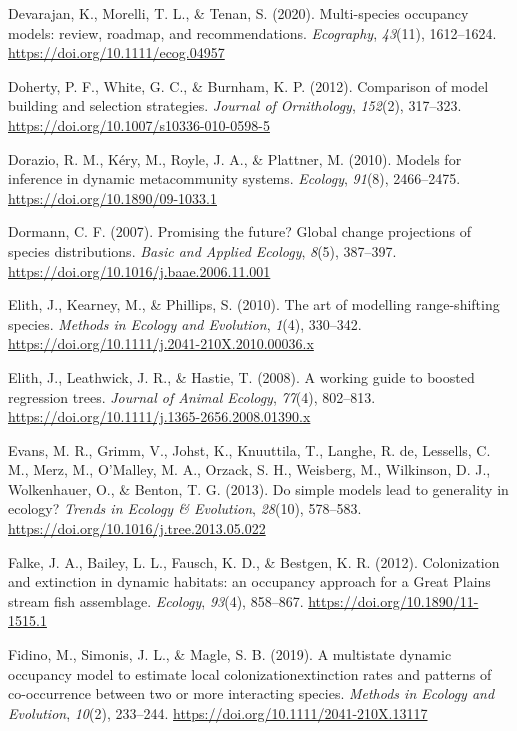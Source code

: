 \documentclass[
]{article}
\newlength{\cslhangindent}
\newenvironment{CSLReferences}[2] %
 {\begin{list}{}{%
  \setlength{\itemindent}{0pt}
  \setlength{\leftmargin}{0pt}
  \setlength{\parsep}{0pt}
  \ifodd #1
   \setlength{\leftmargin}{\cslhangindent}
   \setlength{\itemindent}{-1\cslhangindent}
  \fi
  \setlength{\itemsep}{#2\baselineskip}}}
 {\end{list}}
\begin{document}
\begin{CSLReferences}{1}{0}
Devarajan, K., Morelli, T. L., \& Tenan, S. (2020). Multi{-}species
occupancy models: review, roadmap, and recommendations.
\emph{Ecography}, \emph{43}(11), 1612--1624.
\url{https://doi.org/10.1111/ecog.04957}

Doherty, P. F., White, G. C., \& Burnham, K. P. (2012). Comparison of
model building and selection strategies. \emph{Journal of Ornithology},
\emph{152}(2), 317--323. \url{https://doi.org/10.1007/s10336-010-0598-5}

Dorazio, R. M., Kéry, M., Royle, J. A., \& Plattner, M. (2010). Models
for inference in dynamic metacommunity systems. \emph{Ecology},
\emph{91}(8), 2466--2475. \url{https://doi.org/10.1890/09-1033.1}

Dormann, C. F. (2007). Promising the future? Global change projections
of species distributions. \emph{Basic and Applied Ecology}, \emph{8}(5),
387--397. \url{https://doi.org/10.1016/j.baae.2006.11.001}

Elith, J., Kearney, M., \& Phillips, S. (2010). The art of modelling
range-shifting species. \emph{Methods in Ecology and Evolution},
\emph{1}(4), 330--342.
\url{https://doi.org/10.1111/j.2041-210X.2010.00036.x}

Elith, J., Leathwick, J. R., \& Hastie, T. (2008). A working guide to
boosted regression trees. \emph{Journal of Animal Ecology},
\emph{77}(4), 802--813.
\url{https://doi.org/10.1111/j.1365-2656.2008.01390.x}

Evans, M. R., Grimm, V., Johst, K., Knuuttila, T., Langhe, R. de,
Lessells, C. M., Merz, M., O'Malley, M. A., Orzack, S. H., Weisberg, M.,
Wilkinson, D. J., Wolkenhauer, O., \& Benton, T. G. (2013). Do simple
models lead to generality in ecology? \emph{Trends in Ecology \&
Evolution}, \emph{28}(10), 578--583.
\url{https://doi.org/10.1016/j.tree.2013.05.022}

Falke, J. A., Bailey, L. L., Fausch, K. D., \& Bestgen, K. R. (2012).
Colonization and extinction in dynamic habitats: an occupancy approach
for a Great Plains stream fish assemblage. \emph{Ecology}, \emph{93}(4),
858--867. \url{https://doi.org/10.1890/11-1515.1}

Fidino, M., Simonis, J. L., \& Magle, S. B. (2019). A multistate dynamic
occupancy model to estimate local colonization{\textendash}extinction
rates and patterns of co{-}occurrence between two or more interacting
species. \emph{Methods in Ecology and Evolution}, \emph{10}(2),
233--244. \url{https://doi.org/10.1111/2041-210X.13117}


\end{CSLReferences}
\end{document}
